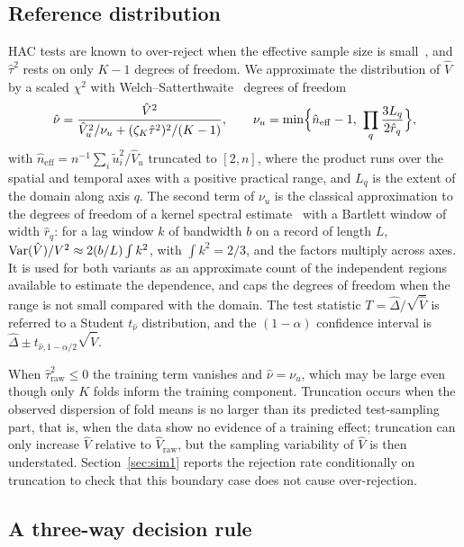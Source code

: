 \subsection{Reference distribution}

HAC tests are known to over-reject when the effective sample size is small~\cite{kiefer2005}, and $\hat\tau^2$ rests on only $K-1$ degrees of freedom. We approximate the distribution of $\hat V$ by a scaled $\chi^2$ with Welch--Satterthwaite~\cite{satterthwaite1946} degrees of freedom
\begin{equation}\label{eq:df}
\hat\nu=\frac{\hat V^2}{\hat V_u^2/\nu_u+(\zeta_K\hat\tau^2)^2/(K-1)},\qquad
\nu_u=\min\Bigl\{\hat n_{\mathrm{eff}}-1,\ \prod_{q}\frac{3L_q}{2\hat r_q}\Bigr\},
\end{equation}
with $\hat n_{\mathrm{eff}}=n^{-1}\sum_i\tilde u_i^2/\hat V_u$ truncated to $[2,n]$, where the product runs over the spatial and temporal axes with a positive practical range, and $L_q$ is the extent of the domain along axis $q$. The second term of $\nu_u$ is the classical approximation to the degrees of freedom of a kernel spectral estimate~\cite{andrews1991} with a Bartlett window of width $\hat r_q$: for a lag window $k$ of bandwidth $b$ on a record of length $L$, $\operatorname{Var}(\hat V)/V^2\approx2(b/L)\int k^2$, with $\int k^2=2/3$, and the factors multiply across axes. It is used for both variants as an approximate count of the independent regions available to estimate the dependence, and caps the degrees of freedom when the range is not small compared with the domain. The test statistic $T=\hat\Delta/\sqrt{\hat V}$ is referred to a Student $t_{\hat\nu}$ distribution, and the $(1-\alpha)$ confidence interval is $\hat\Delta\pm t_{\hat\nu,1-\alpha/2}\sqrt{\hat V}$.

When $\hat\tau^2_{\mathrm{raw}}\le0$ the training term vanishes and $\hat\nu=\nu_u$, which may be large even though only $K$ folds inform the training component. Truncation occurs when the observed dispersion of fold means is no larger than its predicted test-sampling part, that is, when the data show no evidence of a training effect; truncation can only increase $\hat V$ relative to $\hat V_{\mathrm{raw}}$, but the sampling variability of $\hat V$ is then understated. Section~\ref{sec:sim1} reports the rejection rate conditionally on truncation to check that this boundary case does not cause over-rejection.

\subsection{A three-way decision rule}\label{sec:rule}

